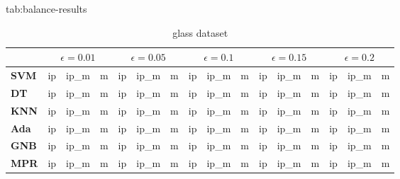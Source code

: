 \begin{table}[htbp]
\scriptsize
\floatconts
  {tab:balance-results}%
  {\caption{glass dataset}}%
  {
\begin{tabular}{l|lll|lll|lll|lll|lll}
             & \multicolumn{3}{c|}{$\epsilon=0.01$} & \multicolumn{3}{c|}{$\epsilon=0.05$} & \multicolumn{3}{c|}{$\epsilon=0.1$} & \multicolumn{3}{c|}{$\epsilon=0.15$} & \multicolumn{3}{c}{$\epsilon=0.2$} \\
\hline
\hline

\hline
\textbf{SVM} & ip         & ip\_m      & m          & ip         & ip\_m      & m          & ip         & ip\_m      & m          & ip         & ip\_m      & m          & ip         & ip\_m      & m           \\
\hline

\hline
\hline

\hline
\textbf{DT}  & ip         & ip\_m      & m          & ip         & ip\_m      & m          & ip         & ip\_m      & m          & ip         & ip\_m      & m          & ip         & ip\_m      & m           \\
\hline

\hline
\hline

\hline
\textbf{KNN} & ip         & ip\_m      & m          & ip         & ip\_m      & m          & ip         & ip\_m      & m          & ip         & ip\_m      & m          & ip         & ip\_m      & m           \\
\hline

\hline
\hline

\hline
\textbf{Ada} & ip         & ip\_m      & m          & ip         & ip\_m      & m          & ip         & ip\_m      & m          & ip         & ip\_m      & m          & ip         & ip\_m      & m           \\
\hline

\hline
\hline

\hline
\textbf{GNB} & ip         & ip\_m      & m          & ip         & ip\_m      & m          & ip         & ip\_m      & m          & ip         & ip\_m      & m          & ip         & ip\_m      & m           \\
\hline

\hline
\hline

\hline
\textbf{MPR} & ip         & ip\_m      & m          & ip         & ip\_m      & m          & ip         & ip\_m      & m          & ip         & ip\_m      & m          & ip         & ip\_m      & m           \\
\hline


\end{tabular}}
\end{table}
